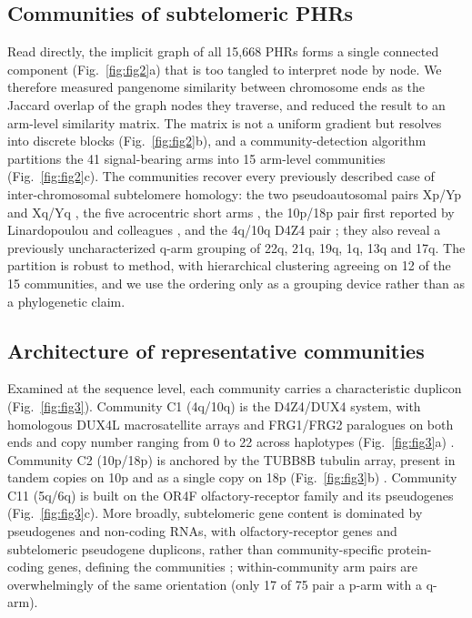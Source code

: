 \documentclass[pdflatex,mathphys]{jnl}
\begin{document}
\subsection*{Communities of subtelomeric PHRs}

Read directly, the implicit graph of all 15,668 PHRs forms a single connected
component (Fig.~\ref{fig:fig2}a) that is too tangled to interpret node by node.
We therefore measured pangenome similarity between chromosome ends as the
Jaccard overlap of the graph nodes they traverse, and reduced the result to an
arm-level similarity matrix.
The matrix is not a uniform gradient but resolves into discrete blocks
(Fig.~\ref{fig:fig2}b), and a community-detection algorithm partitions the 41
signal-bearing arms into 15 arm-level communities (Fig.~\ref{fig:fig2}c).
The communities recover every previously described case of inter-chromosomal
subtelomere homology: the two pseudoautosomal pairs Xp/Yp and Xq/Yq
\cite{sexchrompars_acquaviva2020}, the five acrocentric short arms
\cite{acrocentric_Altemose2022}, the 10p/18p pair first reported by Linardopoulou
and colleagues \cite{Linardopoulou2005}, and the 4q/10q D4Z4 pair
\cite{dux4_d4z4_fshd_lemmers2010worldwide}; they also reveal a previously
uncharacterized q-arm grouping of 22q, 21q, 19q, 1q, 13q and 17q.
The partition is robust to method, with hierarchical clustering agreeing on 12
of the 15 communities, and we use the ordering only as a grouping device rather
than as a phylogenetic claim.

\subsection*{Architecture of representative communities}

Examined at the sequence level, each community carries a characteristic duplicon
(Fig.~\ref{fig:fig3}).
Community C1 (4q/10q) is the D4Z4/DUX4 system, with homologous DUX4L
macrosatellite arrays and FRG1/FRG2 paralogues on both ends and copy number
ranging from 0 to 22 across haplotypes (Fig.~\ref{fig:fig3}a)
\cite{dux4_d4z4_fshd_lemmers2010worldwide,Cabianca2012}.
Community C2 (10p/18p) is anchored by the TUBB8B tubulin array, present in tandem
copies on 10p and as a single copy on 18p (Fig.~\ref{fig:fig3}b)
\cite{Linardopoulou2005}.
Community C11 (5q/6q) is built on the OR4F olfactory-receptor family and its
pseudogenes (Fig.~\ref{fig:fig3}c).
More broadly, subtelomeric gene content is dominated by pseudogenes and
non-coding RNAs, with olfactory-receptor genes and subtelomeric pseudogene
duplicons, rather than community-specific protein-coding genes, defining the
communities \cite{Ambrosini2007}; within-community arm pairs are overwhelmingly
of the same orientation (only 17 of 75 pair a p-arm with a q-arm).
\end{document}
